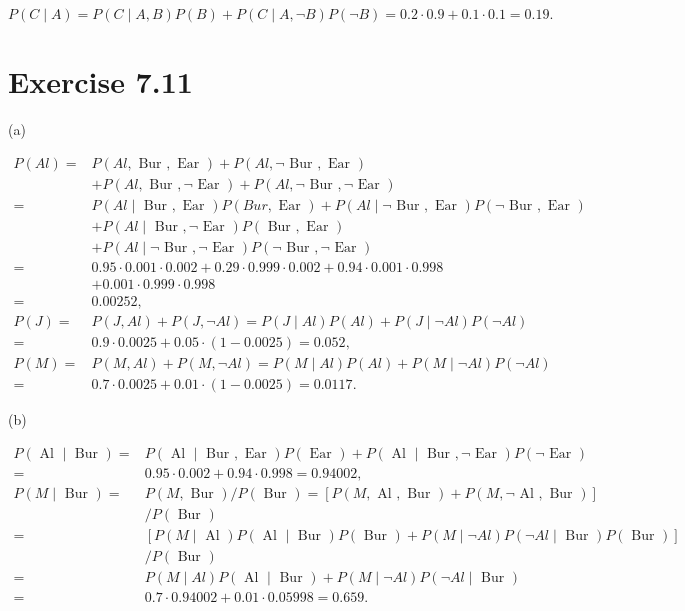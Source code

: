 \documentclass[10pt]{article}
\begin{document}
$$
P(C \mid A)=P(C \mid A, B) P(B)+P(C \mid A, \neg B) P(\neg B)=0.2 \cdot 0.9+0.1 \cdot 0.1=0.19 .
$$

\section*{Exercise 7.11}
(a)

$$
\begin{aligned}
P(A l)= & P(A l, \text { Bur }, \text { Ear })+P(A l, \neg \text { Bur }, \text { Ear }) \\
& +P(A l, \text { Bur }, \neg \text { Ear })+P(A l, \neg \text { Bur }, \neg \text { Ear }) \\
= & P(A l \mid \text { Bur }, \text { Ear }) P(B u r, \text { Ear })+P(A l \mid \neg \text { Bur }, \text { Ear }) P(\neg \text { Bur }, \text { Ear }) \\
& +P(A l \mid \text { Bur }, \neg \text { Ear }) P(\text { Bur }, \text { Ear }) \\
& +P(A l \mid \neg \text { Bur }, \neg \text { Ear }) P(\neg \text { Bur }, \neg \text { Ear }) \\
= & 0.95 \cdot 0.001 \cdot 0.002+0.29 \cdot 0.999 \cdot 0.002+0.94 \cdot 0.001 \cdot 0.998 \\
& +0.001 \cdot 0.999 \cdot 0.998 \\
= & 0.00252, \\
P(J)= & P(J, A l)+P(J, \neg A l)=P(J \mid A l) P(A l)+P(J \mid \neg A l) P(\neg A l) \\
= & 0.9 \cdot 0.0025+0.05 \cdot(1-0.0025)=0.052, \\
P(M)= & P(M, A l)+P(M, \neg A l)=P(M \mid A l) P(A l)+P(M \mid \neg A l) P(\neg A l) \\
= & 0.7 \cdot 0.0025+0.01 \cdot(1-0.0025)=0.0117 .
\end{aligned}
$$

(b)

$$
\begin{aligned}
P(\text { Al } \mid \text { Bur })= & P(\text { Al } \mid \text { Bur }, \text { Ear }) P(\text { Ear })+P(\text { Al } \mid \text { Bur }, \neg \text { Ear }) P(\neg \text { Ear }) \\
= & 0.95 \cdot 0.002+0.94 \cdot 0.998=0.94002, \\
P(M \mid \text { Bur })= & P(M, \text { Bur }) / P(\text { Bur })=[P(M, \text { Al }, \text { Bur })+P(M, \neg \text { Al }, \text { Bur })] \\
& / P(\text { Bur }) \\
= & {[P(M \mid \text { Al }) P(\text { Al } \mid \text { Bur }) P(\text { Bur })+P(M \mid \neg A l) P(\neg A l \mid \text { Bur }) P(\text { Bur })] } \\
& / P(\text { Bur }) \\
= & P(M \mid A l) P(\text { Al } \mid \text { Bur })+P(M \mid \neg A l) P(\neg A l \mid \text { Bur }) \\
= & 0.7 \cdot 0.94002+0.01 \cdot 0.05998=0.659 .
\end{aligned}
$$
\end{document}
